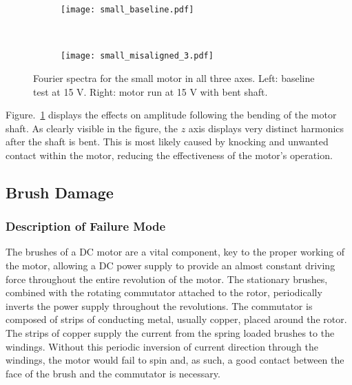 \begin{figure}[t!]
    \centering
    \begin{subfigure}[t]{0.5\textwidth}
        \centering
        \texttt{[image: small\_baseline.pdf]}
    \end{subfigure}%
    ~ 
    \begin{subfigure}[t]{0.5\textwidth}
        \centering
        \texttt{[image: small\_misaligned\_3.pdf]}
    \end{subfigure}
    \caption[Fourier Plot Misaligned Shaft]{Fourier spectra for the small motor in all three axes. Left: baseline test at 15 V. Right: motor run at 15 V with bent shaft.}
    \label{fig:bent_shaft_fourier}
\end{figure}

Figure.~\ref{fig:bent_shaft_fourier} displays the effects on amplitude following the bending of the motor shaft. As clearly visible in the figure, the $z$ axis displays very distinct harmonics after the shaft is bent. This is most likely caused by knocking and unwanted contact within the motor, reducing the effectiveness of the motor's operation.


\subsection{Brush Damage}

\subsubsection{Description of Failure Mode}
The brushes of a DC motor are a vital component, key to the proper working of the motor, allowing a DC power supply to provide an almost constant driving force throughout the entire revolution of the motor. The stationary brushes, combined with the rotating commutator attached to the rotor, periodically inverts the power supply throughout the revolutions. The commutator is composed of strips of conducting metal, usually copper, placed around the rotor. The strips of copper supply the current from the spring loaded brushes to the windings.  Without this periodic inversion of current direction through the windings, the motor would fail to spin and, as such, a good contact between the face of the brush and the commutator is necessary. 

